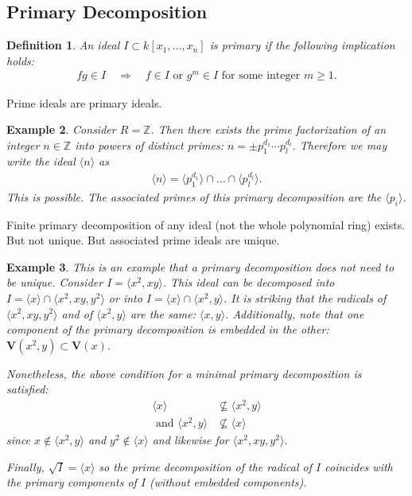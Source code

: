 \documentclass[11pt,a4paper,english]{scrartcl}
\newtheorem{defn}{Definition}
\newtheorem{ex}[defn]{Example}
\newcommand{\V}{\mathbf{V}}
\newcommand{\mvar}[2]{#1_1,\ldots , #1_{#2}}
\newcommand{\kxn}{k[\mvar{x}{n}]}
\begin{document}
\subsection{Primary Decomposition}
\begin{defn}
An ideal $I\subset \kxn$ is \emph{primary} if the following implication holds:
\begin{align*}
fg \in I \quad \Rightarrow \quad f\in I \text{ or } g^m\in I \text{ for some integer } m \geq 1.
\end{align*}
\end{defn}

Prime ideals are primary ideals.

\begin{ex}
Consider $R = \mathbb{Z}$. Then there exists the prime factorization of an integer $n\in \mathbb{Z}$ into powers of distinct primes: $n= \pm p_1^{d_1} \cdots p_l^{d_l}$. Therefore we may write the ideal $\langle n\rangle$ as 
\begin{align*}
\langle n\rangle = \langle p_1^{d_1} \rangle \cap \ldots \cap \langle p_l^{d_l}\rangle .
\end{align*}
This is possible.
The associated primes of this primary decomposition are the $\langle p_i\rangle$.
\end{ex}

Finite primary decomposition of any ideal (not the whole polynomial ring) exists. But not unique. But associated prime ideals are unique.

\begin{ex}
This is an example that a primary decomposition does not need to be unique. Consider $I= \langle x^2, xy \rangle$. This ideal can be decomposed into $I = \langle  x  \rangle\cap  \langle x^2, xy, y^2 \rangle$ or into $I = \langle x \rangle \cap \langle x^2, y \rangle$.
It is striking that the radicals of $\langle x^2, xy, y^2 \rangle$ and of $\langle x^2, y\rangle$ are the same: $\langle x,y \rangle$. Additionally, note that one component of the primary decomposition is embedded in the other: $\V (x^2,y) \subset \V (x)$.

Nonetheless, the above condition for a minimal primary decomposition is satisfied: 
\begin{align*}
\langle  x  \rangle & \nsubseteq  \langle x^2, y \rangle\\
\text{ and }\langle x^2, y \rangle & \nsubseteq \langle  x  \rangle 
\end{align*}
since $x \notin \langle x^2, y \rangle$ and $y^2 \notin \langle x \rangle $ and likewise for $\langle x^2,xy, y^2 \rangle$.

Finally, $\sqrt{I} = \langle x \rangle$ so the prime decomposition of the radical of $I$ coincides with the primary components of $I$ (without embedded components).

\end{ex}
\end{document}
